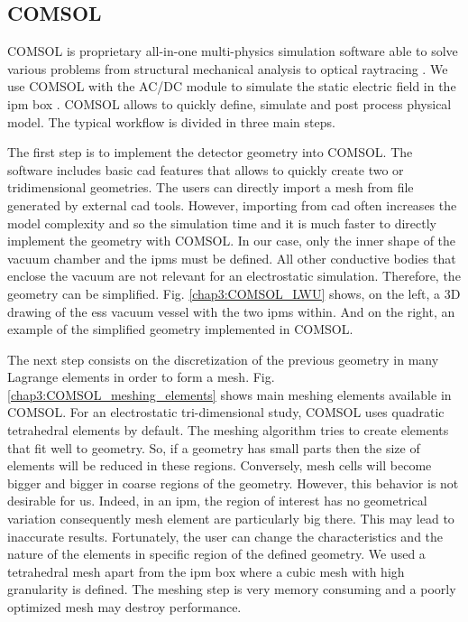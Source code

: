 \begin{refsection}
  \subsection{COMSOL}
  COMSOL is proprietary all-in-one multi-physics simulation software able to solve various problems from structural mechanical analysis to optical raytracing \cite{comsol2018}. We use COMSOL with the AC/DC module to simulate the static electric field in the \acrshort{ipm} box \cite{comsolacdc2018}. COMSOL allows to quickly define, simulate and post process physical model. The typical workflow is divided in three main steps.

  The first step is to implement the detector geometry into COMSOL. The software includes basic \acrshort{cad} features that allows to quickly create two or tridimensional geometries. The users can directly import a mesh from file generated by external \acrshort{cad} tools. However, importing from \acrshort{cad} often increases the model complexity and so the simulation time and it is much faster to directly implement the geometry with COMSOL.  In our case, only the inner shape of the vacuum chamber and the \acrshort{ipm}s must be defined. All other conductive bodies that enclose the vacuum are not relevant for an electrostatic simulation. Therefore, the geometry can be simplified. Fig. \ref{chap3:COMSOL_LWU} shows, on the left, a 3D drawing of the \acrshort{ess} vacuum vessel with the two \acrshort{ipm}s within. And on the right, an example of the simplified geometry implemented in COMSOL.

  

  The next step consists on the discretization of the previous geometry in many Lagrange elements in order to form a mesh. Fig. \ref{chap3:COMSOL_meshing_elements} shows main meshing elements available in COMSOL. For an electrostatic tri-dimensional study, COMSOL uses quadratic tetrahedral elements by default. The meshing algorithm tries to create elements that fit well to geometry. So, if a geometry has small parts then the size of elements will be reduced in these regions. Conversely, mesh cells will become bigger and bigger in coarse regions of the geometry. However, this behavior is not desirable for us. Indeed, in an \acrshort{ipm}, the region of interest has no geometrical variation consequently mesh element are particularly big there. This may lead to inaccurate results. Fortunately, the user can change the characteristics and the nature of the elements in specific region of the defined geometry. We used a tetrahedral mesh apart from the \acrshort{ipm} box where a cubic mesh with high granularity is defined. The meshing step is very memory consuming and a poorly optimized mesh may destroy performance.


\end{refsection}
